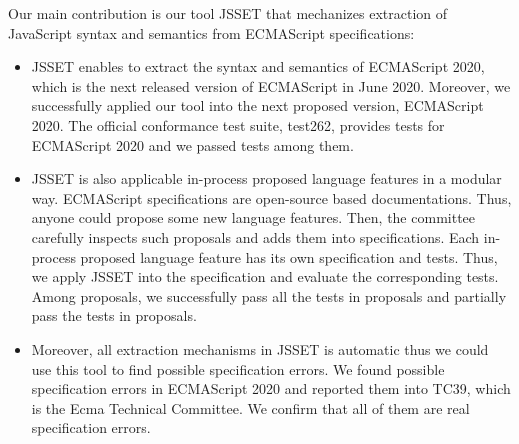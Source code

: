 Our main contribution is our tool JSSET that mechanizes extraction of JavaScript syntax and semantics
from ECMAScript specifications:
\begin{itemize}
  \item JSSET enables to extract the syntax and semantics of ECMAScript 2020,
    which is the next released version of ECMAScript in June 2020.
    Moreover, we successfully applied our tool into the next proposed version,
    ECMAScript 2020. The official conformance test suite, test262, provides
     tests for ECMAScript 2020 and we passed  tests
    among them.
  \item JSSET is also applicable in-process proposed language features in a modular way.
    ECMAScript specifications are open-source based documentations. Thus, anyone
    could propose some new language features. Then, the committee carefully inspects
    such proposals and adds them into specifications. Each in-process proposed language
    feature has its own specification and tests. Thus, we apply JSSET into the specification
    and evaluate the corresponding tests. Among  proposals, we successfully
    pass all the tests in  proposals and partially pass the tests in 
    proposals.
  \item Moreover, all extraction mechanisms in JSSET is automatic thus we could use this tool
    to find possible specification errors. We found  possible specification errors
    in ECMAScript 2020 and reported them into TC39, which is the Ecma Technical Committee.
    We confirm that all of them are real specification errors.
\end{itemize}
